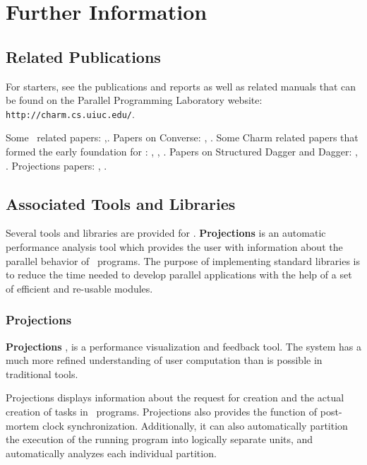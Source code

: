 \section{Further Information}

\subsection{Related Publications}
\label{publications}

For starters, see the publications and reports as well
as related manuals that can be found on the Parallel Programming
Laboratory website: {\tt http://charm.cs.uiuc.edu/}. 

Some \charmpp\ related papers:
\cite{CharmppPPWCPP96},\cite{CharmppOOPSLA93}.  Papers on {\sc Converse}:
\cite{ConverseRTSPP98}, \cite{InterOpIPPS96}. Some
{\sc Charm} related papers that formed the early foundation for \charmpp:
\cite{CharmSys1TPDS94}, \cite{CharmSys2TPDS94},
\cite{CharmOverviewINTL93}.  Papers on Structured Dagger and Dagger: 
\cite{DaggerSyncIPPS94}, \cite{StructDaggerEURO96}.  Projections
papers: \cite{ProjectionsIPPS93}, \cite{Projections}.

\subsection{Associated Tools and Libraries}

Several tools and libraries are provided for \charmpp. {\bf
Projections} is an automatic performance analysis tool which provides
the user with information about the parallel behavior of \charmpp\ programs. The purpose of implementing \charmpp standard
libraries is to reduce the time needed to develop parallel
applications with the help of a set of efficient and re-usable modules.

\subsubsection{Projections}
{\bf Projections} \cite{ProjectionsIPPS93}, \cite{Projections} is a
performance visualization and feedback tool. The system has a much
more refined understanding of user computation than is possible in
traditional tools.

Projections displays information about the request for creation and
the actual creation of tasks in \charmpp\ programs. Projections also
provides the function of post-mortem clock
synchronization. Additionally, it can also automatically partition
the execution of the running program into logically separate units,
and automatically analyzes each individual partition. 

